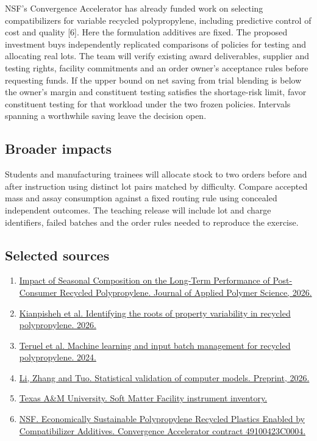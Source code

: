 \documentclass[11pt,letterpaper]{article}
\begin{document}
NSF's Convergence Accelerator has already funded work on selecting compatibilizers for variable recycled polypropylene, including predictive control of cost and quality [6]. Here the formulation additives are fixed. The proposed investment buys independently replicated comparisons of policies for testing and allocating real lots. The team will verify existing award deliverables, supplier and testing rights, facility commitments and an order owner's acceptance rules before requesting funds. If the upper bound on net saving from trial blending is below the owner's margin and constituent testing satisfies the shortage-risk limit, favor constituent testing for that workload under the two frozen policies. Intervals spanning a worthwhile saving leave the decision open.

\subsection*{Broader impacts}

Students and manufacturing trainees will allocate stock to two orders before and after instruction using distinct lot pairs matched by difficulty. Compare accepted mass and assay consumption against a fixed routing rule using concealed independent outcomes. The teaching release will include lot and charge identifiers, failed batches and the order rules needed to reproduce the exercise.

\subsection*{Selected sources}

\begin{enumerate}
\small\setlength{\itemsep}{0pt}
\item \href{https://doi.org/10.1002/app.70501}{Impact of Seasonal Composition on the Long-Term Performance of Post-Consumer Recycled Polypropylene. Journal of Applied Polymer Science, 2026.}
\item \href{https://doi.org/10.1016/j.wasman.2026.115586}{Kianpisheh et al. Identifying the roots of property variability in recycled polypropylene. 2026.}
\item \href{https://doi.org/10.1016/j.jclepro.2023.140390}{Teruel et al. Machine learning and input batch management for recycled polypropylene. 2024.}
\item \href{https://arxiv.org/abs/2604.17144}{Li, Zhang and Tuo. Statistical validation of computer models. Preprint, 2026.}
\item \href{https://somf.engr.tamu.edu/instruments/}{Texas A\&M University. Soft Matter Facility instrument inventory.}
\item \href{https://nsf-gov-resources.nsf.gov/2022-12/2022%20Cohort%20Track%20I%20Phase%201%20Award%20Announcements%20-%20Black%20%26%20Decker%20%28u.s.%29%20Inc.508.pdf}{NSF. Economically Sustainable Polypropylene Recycled Plastics Enabled by Compatibilizer Additives. Convergence Accelerator contract 49100423C0004.}
\end{enumerate}
\end{document}
